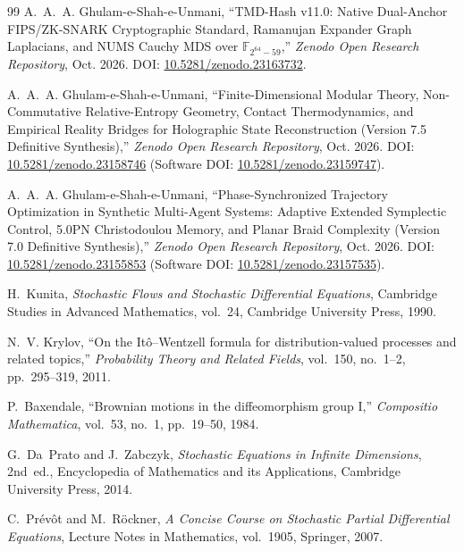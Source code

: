 \documentclass[11pt,a4paper,reqno]{article}
\theoremstyle{definition}
\theoremstyle{remark}
\begin{document}
\begin{thebibliography}{99}
A.~A.~A. Ghulam-e-Shah-e-Unmani,
``TMD-Hash v11.0: Native Dual-Anchor FIPS/ZK-SNARK Cryptographic Standard, Ramanujan Expander Graph Laplacians, and NUMS Cauchy MDS over $\mathbb{F}_{2^{64}-59}$,''
\emph{Zenodo Open Research Repository}, Oct. 2026.
DOI: \href{https://doi.org/10.5281/zenodo.23163732}{10.5281/zenodo.23163732}.

A.~A.~A. Ghulam-e-Shah-e-Unmani,
``Finite-Dimensional Modular Theory, Non-Commutative Relative-Entropy Geometry, Contact Thermodynamics, and Empirical Reality Bridges for Holographic State Reconstruction (Version 7.5 Definitive Synthesis),''
\emph{Zenodo Open Research Repository}, Oct. 2026.
DOI: \href{https://doi.org/10.5281/zenodo.23158746}{10.5281/zenodo.23158746} (Software DOI: \href{https://doi.org/10.5281/zenodo.23159747}{10.5281/zenodo.23159747}).

A.~A.~A. Ghulam-e-Shah-e-Unmani,
``Phase-Synchronized Trajectory Optimization in Synthetic Multi-Agent Systems: Adaptive Extended Symplectic Control, 5.0PN Christodoulou Memory, and Planar Braid Complexity (Version 7.0 Definitive Synthesis),''
\emph{Zenodo Open Research Repository}, Oct. 2026.
DOI: \href{https://doi.org/10.5281/zenodo.23155853}{10.5281/zenodo.23155853} (Software DOI: \href{https://doi.org/10.5281/zenodo.23157535}{10.5281/zenodo.23157535}).

H.~Kunita,
\emph{Stochastic Flows and Stochastic Differential Equations},
Cambridge Studies in Advanced Mathematics, vol.~24, Cambridge University Press, 1990.

N.~V. Krylov,
``On the It\^o--Wentzell formula for distribution-valued processes and related topics,''
\emph{Probability Theory and Related Fields}, vol.~150, no.~1--2, pp.~295--319, 2011.

P.~Baxendale,
``Brownian motions in the diffeomorphism group I,''
\emph{Compositio Mathematica}, vol.~53, no.~1, pp.~19--50, 1984.

G.~Da~Prato and J.~Zabczyk,
\emph{Stochastic Equations in Infinite Dimensions}, 2nd~ed.,
Encyclopedia of Mathematics and its Applications, Cambridge University Press, 2014.

C.~Pr\'ev\^ot and M.~R\"ockner,
\emph{A Concise Course on Stochastic Partial Differential Equations},
Lecture Notes in Mathematics, vol.~1905, Springer, 2007.


\end{thebibliography}
\end{document}
